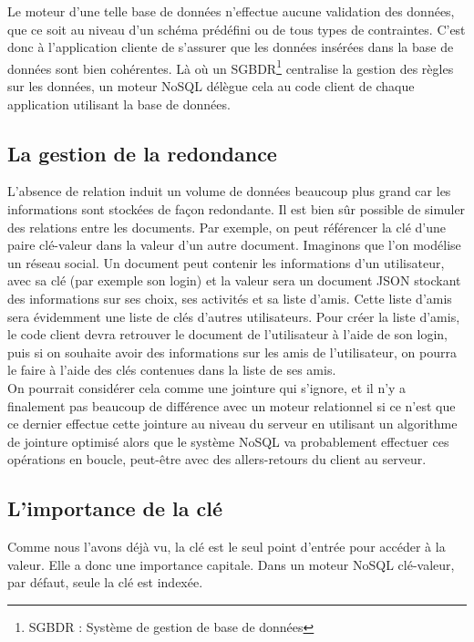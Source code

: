 	Le moteur d'une telle base de données n'effectue aucune validation des données, que ce soit au niveau d'un schéma prédéfini ou de tous types de contraintes. C'est donc à l'application cliente de s'assurer que les données insérées dans la base de données sont bien cohérentes. Là où un SGBDR\footnote{SGBDR : Système de gestion de base de données} centralise la gestion des règles sur les données, un moteur NoSQL délègue cela au code client de chaque application utilisant la base de données.

\subsection{La gestion de la redondance}
	L'absence de relation induit un volume de données beaucoup plus grand car les informations sont stockées de façon redondante. Il est bien sûr possible de simuler des relations entre les documents. Par exemple, on peut référencer la clé d'une paire clé-valeur dans la valeur d'un autre document. Imaginons que l'on modélise un réseau social. Un document peut contenir les informations d'un utilisateur, avec sa clé (par exemple son login) et la valeur sera un document JSON stockant des informations sur ses choix, ses activités et sa liste d'amis. Cette liste d'amis sera évidemment une liste de clés d'autres utilisateurs. Pour créer la liste d'amis, le code client devra retrouver le document de l'utilisateur à l'aide de son login, puis si on souhaite avoir des informations sur les amis de l'utilisateur, on pourra le faire à l'aide des clés contenues dans la liste de ses amis.\\

	On pourrait considérer cela comme une jointure qui s'ignore, et il n'y a finalement pas beaucoup de différence avec un moteur relationnel si ce n'est que ce dernier effectue cette jointure au niveau du serveur en utilisant un algorithme de jointure optimisé alors que le système NoSQL va probablement effectuer ces opérations en boucle, peut-être avec des allers-retours du client au serveur.

\subsection{L'importance de la clé}
	Comme nous l'avons déjà vu, la clé est le seul point d'entrée pour accéder à la valeur. Elle a donc une importance capitale. Dans un moteur NoSQL clé-valeur, par défaut, seule la clé est indexée.\\

